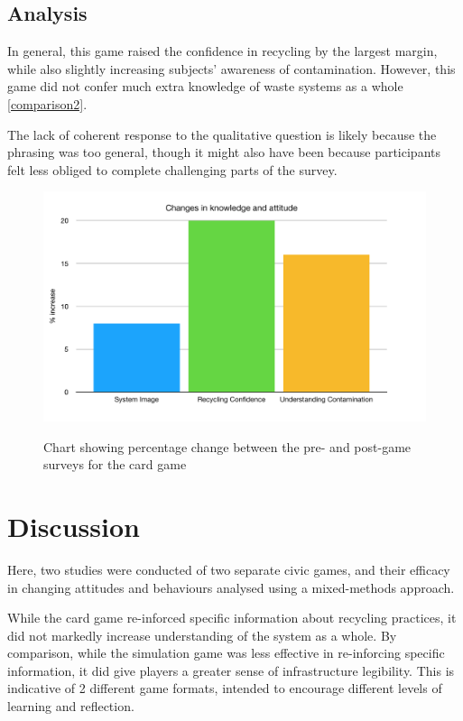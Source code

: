 \documentclass[nofonts,nols,justified,nobib]{tufte-book}
\begin{document}
\subsection*{Analysis} 
In general, this game raised the confidence in recycling by the largest margin, while also slightly increasing subjects' awareness of contamination. However, this game did not confer much extra knowledge of waste systems as a whole \ref{comparison2}.

The lack of coherent response to the qualitative question is likely because the phrasing was too general, though it might also have been because participants felt less obliged to complete challenging parts of the survey. 


\begin{figure}
  \label{comparison2}
  \caption{Chart showing percentage change between the pre- and post-game surveys for the card game}
  \includegraphics[width=1\linewidth]{img/4/attitude-changes-llk.png}
  \label{contamination}
\end{figure}

\section*{Discussion}
Here, two studies were conducted of two separate civic games, and their efficacy in changing attitudes and behaviours analysed using a mixed-methods approach.

While the card game re-inforced specific information about recycling practices, it did not markedly increase understanding of the system as a whole. By comparison, while the simulation game was less effective in re-inforcing specific information, it did give players a greater sense of infrastructure legibility. This is indicative of 2 different game formats, intended to encourage different levels of learning and reflection.
\end{document}
